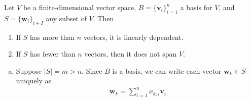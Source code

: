 \documentclass[12pt,letterpaper,reqno]{article}
\numberwithin{equation}{section}
\newcommand{\bv}{\mathbf{v}}
\newcommand{\bw}{\mathbf{w}}
\begin{document}
\begin{thm}
	Let $V$ be a finite-dimensional vector space, $B=\{\bv_i\}_{i=1}^n$ a basis for $V$, and $S=\{\bw_i\}_{i \in I}$ any subset of $V$. Then
	\begin{enumerate}
		\item If $S$ has more than $n$ vectors, it is linearly dependent.
		\item If $S$ has fewer than $n$ vectors, then it does not span $V$.
	\end{enumerate}
\end{thm}

\begin{pf}
	\begin{enumerate}[(a)]
		\item Suppose $|S|=m>n$. Since $B$ is a basis, we can write each vector $\bw_k \in S$ uniquely as 
\begin{align}\label{eq:w_k}
	\bw_k=\sum_{i=1}^nx_{k,i}\bv_i
\end{align}
		

\end{enumerate}
\end{pf}
\end{document}
